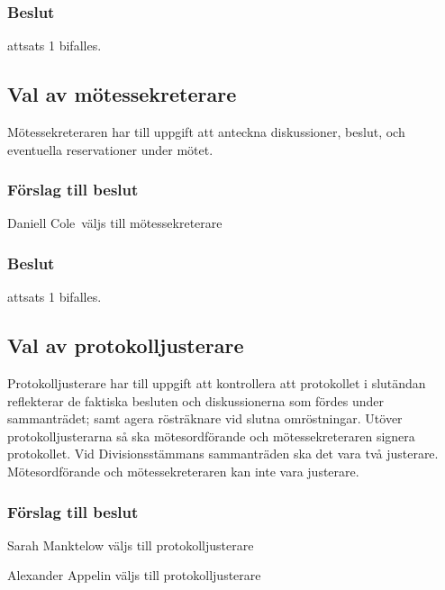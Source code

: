 \documentclass[protokoll]{dvd}
\def\ordf{Daniell Cole}
\begin{document}
\subsubsection*{Beslut}
\begin{attsatser}
    \item attsats 1 bifalles.
\end{attsatser}

\subsection{Val av mötessekreterare}

Mötessekreteraren har till uppgift att anteckna diskussioner, beslut, och eventuella reservationer under mötet.

\subsubsection*{Förslag till beslut}
\begin{attsatser}
    \item \ordf\ väljs till mötessekreterare
\end{attsatser}

\subsubsection*{Beslut}
\begin{attsatser}
    \item attsats 1 bifalles.
\end{attsatser}

\subsection{Val av protokolljusterare}

Protokolljusterare har till uppgift att kontrollera att protokollet i slutändan reflekterar de faktiska besluten och diskussionerna som fördes under sammanträdet; samt agera rösträknare vid slutna omröstningar.
Utöver protokolljusterarna så ska mötesordförande och mötessekreteraren signera protokollet.
Vid Divisionsstämmans sammanträden ska det vara två justerare.\\
Mötesordförande och mötessekreteraren kan inte vara justerare.

\subsubsection*{Förslag till beslut}
\begin{attsatser}
    \item Sarah Manktelow väljs till protokolljusterare
    \item Alexander Appelin väljs till protokolljusterare
\end{attsatser}
\end{document}
